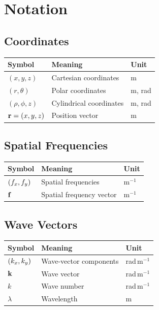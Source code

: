 \chapter{Notation}

\section{Coordinates}

\begin{center}
\begin{tabular}{lll}
\toprule
Symbol & Meaning & Unit\\
\midrule
$(x,y,z)$              & Cartesian coordinates      & m\\
$(r,\theta)$           & Polar coordinates          & m, rad\\
$(\rho,\phi,z)$        & Cylindrical coordinates    & m, rad\\
$\mathbf{r}=(x,y,z)$        & Position vector            & m\\
\bottomrule
\end{tabular}
\end{center}


\section{Spatial Frequencies}

\begin{center}
\begin{tabular}{lll}
\toprule
Symbol & Meaning & Unit\\
\midrule
$(f_x,f_y)$      & Spatial frequencies & m$^{-1}$\\
$\mathbf{f}$              & Spatial frequency vector & m$^{-1}$\\
\bottomrule
\end{tabular}
\end{center}


\section{Wave Vectors}

\begin{center}
\begin{tabular}{lll}
\toprule
Symbol & Meaning & Unit\\
\midrule
$(k_x,k_y)$ & Wave-vector components & rad\,m$^{-1}$\\
$\mathbf{k}$         & Wave vector            & rad\,m$^{-1}$\\
$k$             & Wave number            & rad\,m$^{-1}$\\
$\lambda$       & Wavelength             & m\\
\bottomrule
\end{tabular}
\end{center}

